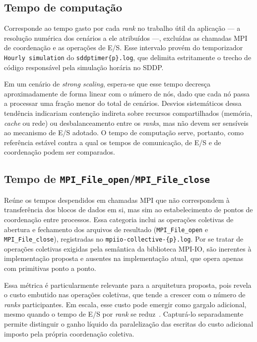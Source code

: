 \subsection{Tempo de computação}
\label{sec:metrica_computacao}

Corresponde ao tempo gasto por cada \textit{rank} no trabalho útil da
aplicação --- a resolução numérica dos cenários a ele atribuídos ---,
excluídas as chamadas MPI de coordenação e as operações de E/S. Esse
intervalo provém do temporizador \texttt{Hourly simulation}
do \texttt{sddptimer\{p\}.log}, que delimita estritamente o trecho de
código responsável pela simulação horária no SDDP.

Em um cenário de \textit{strong scaling}, espera-se que esse tempo
decresça aproximadamente de forma linear com o número de nós, dado que
cada nó passa a processar uma fração menor do total de cenários.
Desvios sistemáticos dessa tendência indicariam contenção indireta
sobre recursos compartilhados (memória, \textit{cache} ou rede) ou
desbalanceamento entre os \textit{ranks}, mas não devem ser
sensíveis ao mecanismo de E/S adotado. O tempo de computação serve,
portanto, como referência estável contra a qual os tempos de
comunicação, de E/S e de coordenação podem ser comparados.

\subsection{Tempo de \texttt{MPI\_File\_open}/\texttt{MPI\_File\_close}}
\label{sec:metrica_coordenacao}

Reúne os tempos despendidos em chamadas MPI que não correspondem à
transferência dos blocos de dados em si, mas sim ao estabelecimento de
pontos de coordenação entre processos. Essa categoria inclui
as operações coletivas de abertura e fechamento dos arquivos de
resultado (\texttt{MPI\_File\_open} e \texttt{MPI\_File\_close}),
registradas no \texttt{mpiio-collective-\{p\}.log}. Por se tratar de
operações coletivas exigidas pela semântica da biblioteca MPI-IO, são
inerentes à implementação proposta e ausentes na implementação atual,
que opera apenas com primitivas ponto a ponto.

Essa métrica é particularmente relevante para a arquitetura proposta,
pois revela o custo embutido nas operações coletivas, que tende a
crescer com o número de \textit{ranks} participantes. Em escala, esse
custo pode emergir como gargalo adicional, mesmo quando o tempo de E/S
por \textit{rank} se reduz~\cite{mpiioCite}. Capturá-lo separadamente
permite distinguir o ganho líquido da paralelização das escritas do
custo adicional imposto pela própria coordenação coletiva.

